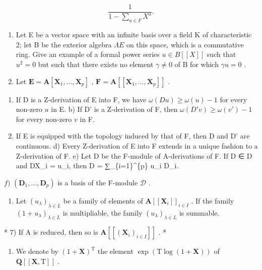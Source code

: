 \[
\frac {1}{1 - \sum_ {a \in F} X ^ {a}}.
\]

\begin{enumerate}
\def\labelenumi{\arabic{enumi})}
\setcounter{enumi}{3}
\item
  Let E be a vector space with an infinite basis over a field K of characteristic 2; let B be the exterior algebra \(\Lambda E\) on this space, which is a commutative ring. Give an example of a formal power series \(u \in B[[X]]\) such that \(u^2 = 0\) but such that there exists no element \(\gamma \neq 0\) of B for which \(\gamma u = 0\) .
\item
  Let \(\mathbf{E} = \mathbf{A}[\mathbf{X}_1, \dots, \mathbf{X}_p]\) , \(\mathbf{F} = \mathbf{A}[[\mathbf{X}_1, \dots, \mathbf{X}_p]]\) .
\end{enumerate}

\begin{enumerate}
\def\labelenumi{\alph{enumi})}
\item
  If D is a Z-derivation of E into F, we have \(\omega(Du) \geqslant \omega(u) - 1\) for every non-zero \(u\) in E. b) If D' is a Z-derivation of F, then \(\omega(D'v) \geqslant \omega(v') - 1\) for every non-zero \(v\) in F.
\item
  If E is equipped with the topology induced by that of F, then D and D' are continuous. d) Every Z-derivation of E into F extends in a unique fashion to a Z-derivation of F. e) Let D be the F-module of A-derivations of F. If D ∈ D and DX\_i = u\_i, then D = ∑\_\{i=1\}\^{}\{p\} u\_i D\_i.
\end{enumerate}

\(f)\) \((\mathbf{D}_1,\dots ,\mathbf{D}_p)\) is a basis of the F-module \(\mathcal{D}\) .

\begin{enumerate}
\def\labelenumi{\arabic{enumi})}
\setcounter{enumi}{5}
\tightlist
\item
  Let \((u_{\lambda})_{\lambda \in L}\) be a family of elements of \(\mathbf{A}[[\mathbf{X}_i]]_{i\in I}\) . If the family \((1 + u_{\lambda})_{\lambda \in L}\) is multipliable, the family \((u_{\lambda})_{\lambda \in L}\) is summable.
\end{enumerate}

* 7) If A is reduced, then so is \(\mathbf{A}[[(\mathbf{X}_i)_{i\in I}]]\) . *

\begin{enumerate}
\def\labelenumi{\arabic{enumi})}
\setcounter{enumi}{7}
\tightlist
\item
  We denote by \((1 + \mathbf{X})^{\mathrm{T}}\) the element \(\exp (\mathrm{T}\log (1 + \mathbf{X}))\) of \(\mathbf{Q}[[\mathbf{X},\mathrm{T}]]\) .
\end{enumerate}

